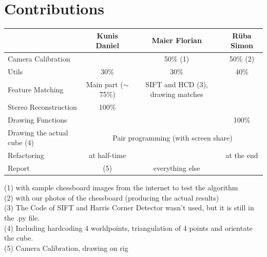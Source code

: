 \documentclass[paper=a4, fontsize=11pt]{scrartcl}
\numberwithin{equation}{section}		%
\numberwithin{figure}{section}			%
\numberwithin{table}{section}				%
\begin{document}
\section*{Contributions}
\begin{table}[!htbp]
\begin{tabular}{|l|ccc|}
\hline
{\color[HTML]{656565} }                        & {\color[HTML]{9B9B9B} Kunis Daniel}         & {\color[HTML]{9B9B9B} Maier Florian}                   & {\color[HTML]{9B9B9B} Rüba Simon} \\ \hline
{\color[HTML]{9B9B9B} Camera Calibration}      & \multicolumn{1}{c|}{}                       & \multicolumn{1}{c|}{50\% (1)}                          & 50\% (2)                          \\ \cline{2-4} 
{\color[HTML]{9B9B9B} Utils}                   & \multicolumn{1}{c|}{30\%}                   & \multicolumn{1}{c|}{30\%}                              & 40\%                              \\ \cline{2-4} 
{\color[HTML]{9B9B9B} Feature Matching}        & \multicolumn{1}{c|}{Main part ($\sim$75\%)} & \multicolumn{1}{c|}{SIFT and HCD (3), drawing matches} &                                   \\ \cline{2-4} 
{\color[HTML]{9B9B9B} Stereo Reconstruction}   & \multicolumn{1}{c|}{100\%}                  & \multicolumn{1}{c|}{}                                  &                                   \\ \cline{2-4} 
{\color[HTML]{9B9B9B} Drawing Functions}       & \multicolumn{1}{c|}{}                       & \multicolumn{1}{c|}{}                                  & 100\%                             \\ \cline{2-4} 
{\color[HTML]{9B9B9B} Drawing the actual cube (4)} & \multicolumn{3}{c|}{Pair programming (with screen share)}                                                                                \\ \cline{2-4} 
{\color[HTML]{9B9B9B} Refactoring}             & \multicolumn{1}{c|}{at half-time}           & \multicolumn{1}{c|}{}                                  & at the end                        \\ \cline{2-4} 
{\color[HTML]{9B9B9B} Report}                  & \multicolumn{1}{c|}{(5)}     & \multicolumn{1}{c|}{everything else}                   &                                   \\ \hline
\end{tabular}
\end{table}\smallskip\noindent(1) with sample chessboard images from the internet to test the algorithm\\(2) with our photos of the chessboard (producing the actual results)\\(3) The Code of SIFT and Harris Corner Detector wasn't used, but it is still in the .py file.\\(4) Including hardcoding 4 worldpoints, triangulation of 4 points and orientate the cube.\\(5) Camera Calibration, drawing on rig


\end{document}

